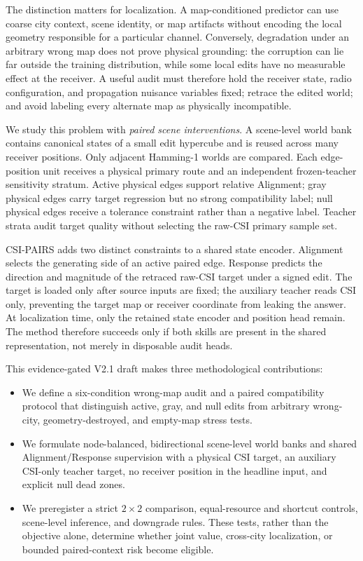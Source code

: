 \documentclass{article}
\newcommand{\method}{CSI-PAIRS}
\begin{document}
The distinction matters for localization.  A map-conditioned predictor can use
coarse city context, scene identity, or map artifacts without encoding the
local geometry responsible for a particular channel.  Conversely, degradation
under an arbitrary wrong map does not prove physical grounding: the corruption
can lie far outside the training distribution, while some local edits have no
measurable effect at the receiver.  A useful audit must therefore hold the
receiver state, radio configuration, and propagation nuisance variables fixed;
retrace the edited world; and avoid labeling every alternate map as physically
incompatible.

We study this problem with \emph{paired scene interventions}.  A scene-level
world bank contains canonical states of a small edit hypercube and is reused
across many receiver positions.  Only adjacent Hamming-1 worlds are compared.
Each edge-position unit receives a physical primary route and an independent
frozen-teacher sensitivity stratum.  Active physical edges support relative
Alignment; gray physical edges carry target regression but no strong
compatibility label; null physical edges receive a tolerance constraint rather
than a negative label.  Teacher strata audit target quality without selecting
the raw-CSI primary sample set.

\method{} adds two distinct constraints to a shared state encoder.  Alignment
selects the generating side of an active paired edge.  Response predicts the
direction and magnitude of the retraced raw-CSI target under a signed edit.  The
target is loaded only after source inputs are fixed; the auxiliary teacher reads
CSI only, preventing the target map or receiver coordinate from leaking the answer.
At localization time, only the retained state encoder and
position head remain.  The method therefore succeeds only if both skills are
present in the shared representation, not merely in disposable audit heads.

This evidence-gated V2.1 draft makes three methodological contributions:

\begin{itemize}
    \item We define a six-condition wrong-map audit and a paired compatibility
    protocol that distinguish active, gray, and null edits from arbitrary
    wrong-city, geometry-destroyed, and empty-map stress tests.
    \item We formulate node-balanced, bidirectional scene-level world banks and
    shared Alignment/Response supervision with a physical CSI target, an
    auxiliary CSI-only teacher target, no receiver position in the headline
    input, and explicit null dead zones.
    \item We preregister a strict $2\times2$ comparison, equal-resource and
    shortcut controls, scene-level inference, and downgrade rules.  These tests,
    rather than the objective alone, determine whether joint value,
    cross-city localization, or bounded paired-context risk become eligible.
\end{itemize}
\end{document}
